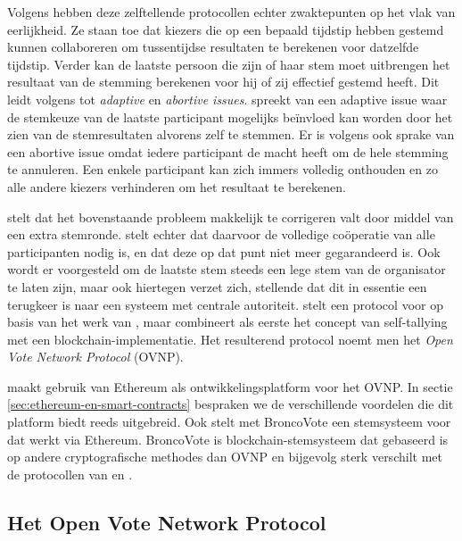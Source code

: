 		Volgens \textcite{McCorry2017}  hebben deze zelftellende protocollen echter zwaktepunten op het vlak van eerlijkheid. Ze staan toe dat kiezers die op een bepaald tijdstip hebben gestemd kunnen collaboreren om tussentijdse resultaten te berekenen voor datzelfde tijdstip. Verder kan de laatste persoon die zijn of haar stem moet uitbrengen het resultaat van de stemming berekenen voor hij of zij effectief gestemd heeft. Dit leidt volgens \textcite{McCorry2017} tot \textit{adaptive} en \textit{abortive issues}.  \textcite{McCorry2017} spreekt van een adaptive issue waar de stemkeuze van de laatste participant mogelijks beïnvloed kan worden door het zien van de stemresultaten alvorens zelf te stemmen. Er is volgens \textcite{McCorry2017}  ook sprake van een abortive issue omdat iedere participant de macht heeft om de hele stemming te annuleren. Een enkele participant kan zich immers volledig onthouden en zo alle andere kiezers verhinderen om het resultaat te berekenen. 
			
		\textcite{Kiayias2002} stelt dat het bovenstaande probleem makkelijk te corrigeren valt door middel van een extra stemronde. \textcite{McCorry2017} stelt echter dat daarvoor de volledige coöperatie van alle participanten nodig is, en dat deze op dat punt niet meer gegarandeerd is. Ook wordt er voorgesteld om de laatste stem steeds een lege stem van de organisator te laten zijn, maar ook hiertegen verzet \textcite{McCorry2017} zich, stellende dat dit in essentie een terugkeer is naar een systeem met centrale autoriteit.  \textcite{McCorry2017} stelt een protocol voor op basis van het werk van \textcite{Kiayias2002}, maar combineert als eerste het concept van self-tallying met een blockchain-implementatie. Het resulterend protocol noemt men het \textit{Open Vote Network Protocol} (OVNP).
		
		 \textcite{McCorry2017} maakt gebruik van Ethereum als ontwikkelingsplatform voor het OVNP. In sectie \ref{sec:ethereum-en-smart-contracts} bespraken we de verschillende voordelen die dit platform biedt reeds uitgebreid. Ook stelt \textcite{Dagher2018} met BroncoVote een stemsysteem voor dat werkt via Ethereum. BroncoVote is blockchain-stemsysteem dat gebaseerd is op andere cryptografische methodes dan OVNP en bijgevolg sterk verschilt met de protocollen van \textcite{Kiayias2002} en \textcite{McCorry2017}. 
	
	\subsection{Het Open Vote Network Protocol}
	\label{sec:OVNP}
